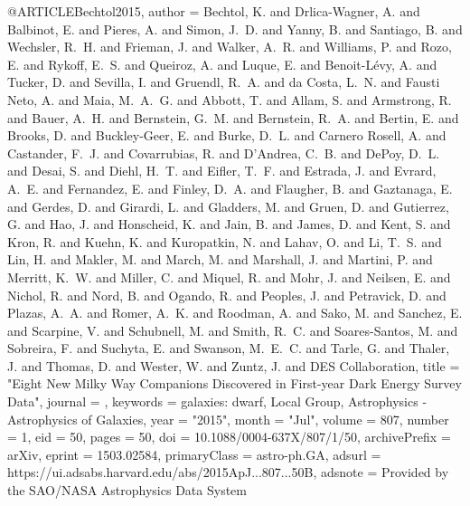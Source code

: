 \documentclass[apj]{emulateapj}
\begin{document}
{{@ARTICLE{Bechtol2015,
       author = {{Bechtol}, K. and {Drlica-Wagner}, A. and {Balbinot}, E. and
         {Pieres}, A. and {Simon}, J.~D. and {Yanny}, B. and {Santiago}, B. and
         {Wechsler}, R.~H. and {Frieman}, J. and {Walker}, A.~R. and
         {Williams}, P. and {Rozo}, E. and {Rykoff}, E.~S. and {Queiroz}, A. and
         {Luque}, E. and {Benoit-L{\'e}vy}, A. and {Tucker}, D. and
         {Sevilla}, I. and {Gruendl}, R.~A. and {da Costa}, L.~N. and
         {Fausti Neto}, A. and {Maia}, M.~A.~G. and {Abbott}, T. and
         {Allam}, S. and {Armstrong}, R. and {Bauer}, A.~H. and
         {Bernstein}, G.~M. and {Bernstein}, R.~A. and {Bertin}, E. and
         {Brooks}, D. and {Buckley-Geer}, E. and {Burke}, D.~L. and
         {Carnero Rosell}, A. and {Castander}, F.~J. and {Covarrubias}, R. and
         {D'Andrea}, C.~B. and {DePoy}, D.~L. and {Desai}, S. and
         {Diehl}, H.~T. and {Eifler}, T.~F. and {Estrada}, J. and
         {Evrard}, A.~E. and {Fernandez}, E. and {Finley}, D.~A. and
         {Flaugher}, B. and {Gaztanaga}, E. and {Gerdes}, D. and {Girardi}, L. and
         {Gladders}, M. and {Gruen}, D. and {Gutierrez}, G. and {Hao}, J. and
         {Honscheid}, K. and {Jain}, B. and {James}, D. and {Kent}, S. and
         {Kron}, R. and {Kuehn}, K. and {Kuropatkin}, N. and {Lahav}, O. and
         {Li}, T.~S. and {Lin}, H. and {Makler}, M. and {March}, M. and
         {Marshall}, J. and {Martini}, P. and {Merritt}, K.~W. and {Miller}, C. and
         {Miquel}, R. and {Mohr}, J. and {Neilsen}, E. and {Nichol}, R. and
         {Nord}, B. and {Ogando}, R. and {Peoples}, J. and {Petravick}, D. and
         {Plazas}, A.~A. and {Romer}, A.~K. and {Roodman}, A. and {Sako}, M. and
         {Sanchez}, E. and {Scarpine}, V. and {Schubnell}, M. and
         {Smith}, R.~C. and {Soares-Santos}, M. and {Sobreira}, F. and
         {Suchyta}, E. and {Swanson}, M.~E.~C. and {Tarle}, G. and {Thaler}, J. and
         {Thomas}, D. and {Wester}, W. and {Zuntz}, J. and {DES Collaboration}},
        title = "{Eight New Milky Way Companions Discovered in First-year Dark Energy Survey Data}",
      journal = {\apj},
     keywords = {galaxies: dwarf, Local Group, Astrophysics - Astrophysics of Galaxies},
         year = "2015",
        month = "Jul",
       volume = {807},
       number = {1},
          eid = {50},
        pages = {50},
          doi = {10.1088/0004-637X/807/1/50},
archivePrefix = {arXiv},
       eprint = {1503.02584},
 primaryClass = {astro-ph.GA},
       adsurl = {https://ui.adsabs.harvard.edu/abs/2015ApJ...807...50B},
      adsnote = {Provided by the SAO/NASA Astrophysics Data System}
}


}}
\end{document}
